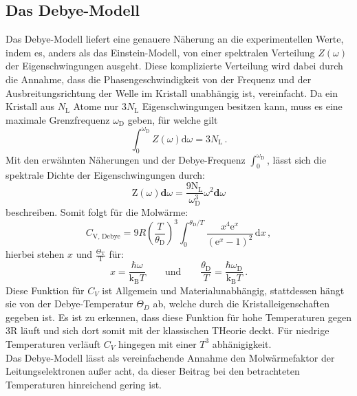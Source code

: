 \subsection{Das Debye-Modell}
Das Debye-Modell liefert eine genauere Näherung an die experimentellen Werte, indem es, anders als das Einstein-Modell, von einer spektralen Verteilung $Z(\omega)$ der Eigenschwingungen ausgeht.
Diese komplizierte Verteilung wird dabei durch die Annahme, dass die Phasengeschwindigkeit von der Frequenz und der Ausbreitungsrichtung der Welle im Kristall unabhängig ist, vereinfacht.
Da ein Kristall aus $N_\text{L}$ Atome nur $3N_\text{L}$ Eigenschwingungen besitzen kann, muss es eine maximale Grenzfrequenz $\omega_\text{D}$ geben, für welche gilt
\begin{equation}
  \int_0^{\omega_\text{D}} Z(\omega)\text{d}\omega = 3N_\text{L}\,.
\end{equation}
Mit den erwähnten Näherungen und der Debye-Frequenz $\int_0^{\omega_\text{D}}$, lässt sich die spektrale Dichte der Eigenschwingungen durch:
\begin{equation}
  \text{Z}(\omega)\textbf{d}\omega= \frac{9\text{N}_\text{L}}{\omega_{\text{D}}^3}\omega^2\textbf{d}\omega
\end{equation}
beschreiben.
Somit folgt für die Molwärme:
\begin{equation}
 C_\text{V, Debye} = 9R \left(\frac{T}{\theta_\text{D}}\right)^3 \int_0^{\theta_\text{D}/T} \frac{x^4\text{e}^x}{(\text{e}^x-1)^2}\,\text{d}x \, ,
\end{equation}
hierbei stehen $x$ und $\frac{\Theta_\text{T}}{\text{T}}$ für:
\begin{equation}
  x = \frac{\hbar\omega}{\text{k}_\text{B}T} \qquad \text{und} \qquad \frac{\theta_\text{D}}{T} = \frac{\hbar\omega_\text{D}}{\text{k}_\text{B}T}\,.
\end{equation}
Diese Funktion für $C_V$ ist Allgemein und Materialunabhängig, stattdessen hängt sie von der Debye-Temperatur $\Theta_D$ ab, welche durch die Kristalleigenschaften gegeben ist. Es ist zu erkennen, dass diese Funktion
für hohe Temperaturen gegen 3R läuft und sich dort somit mit der klassischen THeorie deckt. Für niedrige Temperaturen verläuft $C_V$ hingegen mit einer $T^3$ abhänigigkeit.\\
Das Debye-Modell lässt als vereinfachende Annahme den Molwärmefaktor der Leitungselektronen außer acht, da dieser Beitrag bei den betrachteten Temperaturen hinreichend gering ist.
